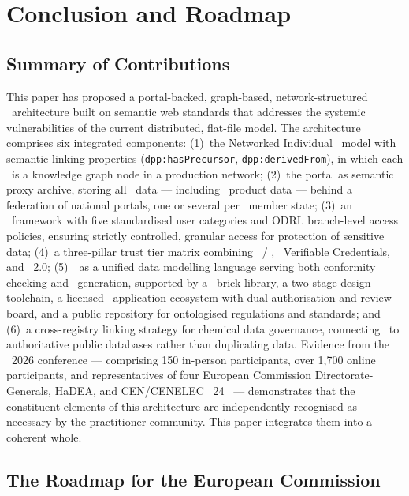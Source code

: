 \section{Conclusion and Roadmap}

\subsection{Summary of Contributions}

This paper has proposed a portal-backed, graph-based, network-structured \DPP\
architecture built on semantic web standards that addresses the systemic
vulnerabilities of the current distributed, flat-file model. The architecture
comprises six integrated components: (1)~the Networked Individual \DPP\ model
with semantic linking properties (\texttt{dpp:hasPrecursor},
\texttt{dpp:derivedFrom}), in which each \DPP\ is a knowledge graph node in a
production network; (2)~the portal as semantic proxy archive, storing all \DPP\
data --- including \REO\ product data --- behind a federation of national
portals, one or several per \EU\ member state; (3)~an \ABAC\ framework
with five
standardised user categories and ODRL branch-level access policies, ensuring
strictly controlled, granular access for protection of sensitive data; (4)~a
three-pillar trust tier matrix combining \EORI\ / \VIES, \WthreeC\ Verifiable
Credentials, and \eIDAS~2.0; (5)~\SHACL\ as a unified data modelling language
serving both conformity checking and \GUI\ generation, supported by a \SHACL\
brick library, a two-stage design toolchain, a licensed \DPP\ application
ecosystem with dual authorisation and review board, and a public repository for
ontologised regulations and standards; and (6)~a cross-registry linking strategy
for chemical data governance, connecting \DPPs\ to authoritative public
databases rather than duplicating data. Evidence from the \DPPforEU~2026
conference --- comprising 150 in-person participants, over 1,700 online
participants, and representatives of four European Commission
Directorate-Generals, HaDEA, and CEN/CENELEC \JTC~24~\cite{dpp4eu2026_postconf}
--- demonstrates that the constituent elements of this architecture are
independently recognised as necessary by the practitioner community. This paper
integrates them into a coherent whole.

\subsection{The Roadmap for the European Commission}

